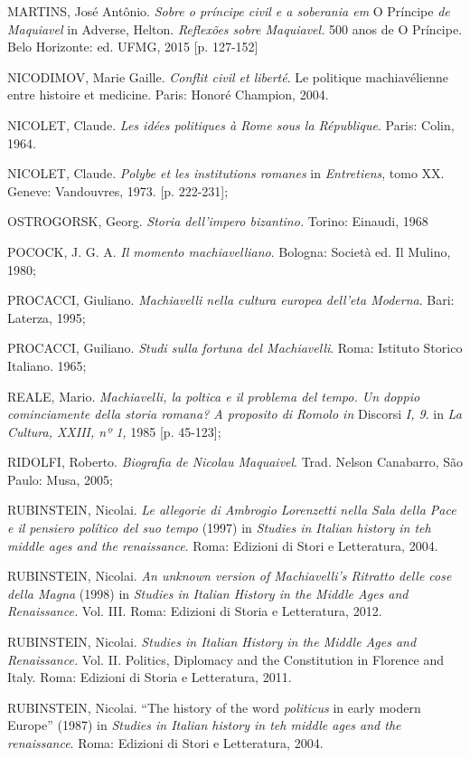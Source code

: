 \begin{Parskip}
MARTINS, José Antônio. \emph{Sobre o príncipe civil e a soberania em} O
Príncipe \emph{de Maquiavel} in Adverse, Helton. \emph{Reflexões sobre
Maquiavel.} 500 anos de O Príncipe. Belo Horizonte: ed. UFMG, 2015 {[}p.
127-152{]}

NICODIMOV, Marie Gaille. \emph{Conflit civil et liberté}. Le politique
machiavélienne entre histoire et medicine. Paris: Honoré Champion, 2004.

NICOLET, Claude. \emph{Les idées politiques à Rome sous la République}.
Paris: Colin, 1964.

NICOLET, Claude. \emph{Polybe et les institutions romanes} in
\emph{Entretiens}, tomo XX. Geneve: Vandouvres, 1973. {[}p. 222-231{]};

OSTROGORSK, Georg. \emph{Storia dell'impero bizantino.} Torino: Einaudi,
1968

POCOCK, J. G. A. \emph{Il momento machiavelliano}. Bologna: Società ed.
Il Mulino, 1980;

PROCACCI, Giuliano. \emph{Machiavelli nella cultura europea dell'eta
Moderna}. Bari: Laterza, 1995;

PROCACCI, Guiliano. \emph{Studi sulla fortuna del Machiavelli}. Roma:
Istituto Storico Italiano. 1965;

REALE, Mario. \emph{Machiavelli, la poltica e il problema del tempo. Un
doppio cominciamente della storia romana? A proposito di Romolo in}
Discorsi \emph{I, 9}. in \emph{La Cultura, XXIII, nº 1,} 1985 {[}p.
45-123{]};

RIDOLFI, Roberto. \emph{Biografia de Nicolau Maquaivel}. Trad. Nelson
Canabarro, São Paulo: Musa, 2005;

RUBINSTEIN, Nicolai. \emph{Le allegorie di Ambrogio Lorenzetti nella
Sala della Pace e il pensiero político del suo tempo} (1997) in
\emph{Studies in Italian history in teh middle ages and the
renaissance}. Roma: Edizioni di Stori e Letteratura, 2004.

RUBINSTEIN, Nicolai. \emph{An unknown version of Machiavelli's Ritratto
delle cose della Magna} (1998) in \emph{Studies in Italian History in
the Middle Ages and Renaissance.} Vol. III. Roma: Edizioni di Storia e
Letteratura, 2012.

RUBINSTEIN, Nicolai. \emph{Studies in Italian History in the Middle Ages
and Renaissance.} Vol. II. Politics, Diplomacy and the Constitution in
Florence and Italy. Roma: Edizioni di Storia e Letteratura, 2011.

RUBINSTEIN, Nicolai. ``The history of the word \emph{politicus} in early
modern Europe'' (1987) in \emph{Studies in Italian history in teh middle
ages and the renaissance}. Roma: Edizioni di Stori e Letteratura, 2004.


\end{Parskip}
